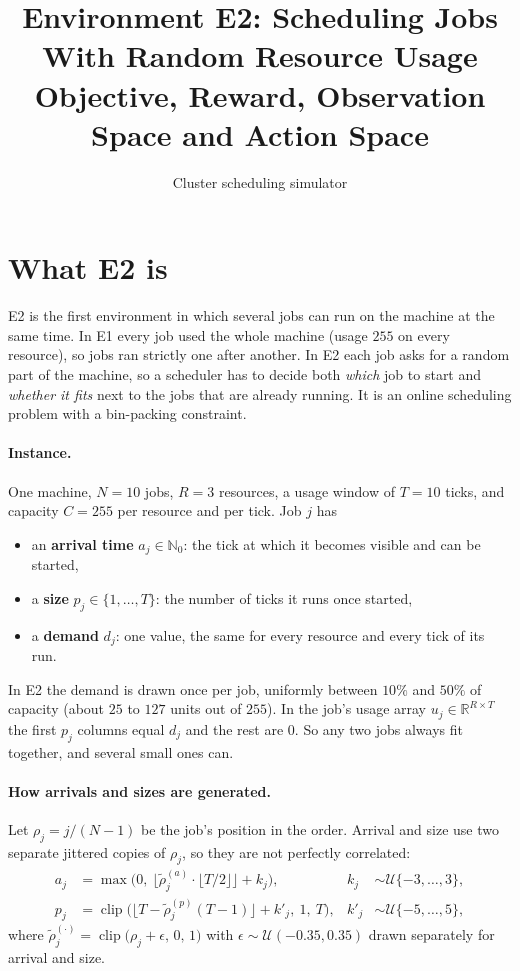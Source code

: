 \documentclass[11pt]{article}
\title{Environment E2: Scheduling Jobs With Random Resource Usage\\
\large Objective, Reward, Observation Space and Action Space}
\author{Cluster scheduling simulator}
\date{}
\newcommand{\N}{N}              %
\newcommand{\R}{R}              %
\newcommand{\Tw}{T}             %
\newcommand{\Cap}{C}            %
\begin{document}
\maketitle

\section{What E2 is}

E2 is the first environment in which several jobs can run on the machine at the same time. In E1 every job used the whole machine (usage $255$ on every resource), so jobs ran strictly one after another. In E2 each job asks for a random part of the machine, so a scheduler has to decide both \emph{which} job to start and \emph{whether it fits} next to the jobs that are already running. It is an online scheduling problem with a bin-packing constraint.

\paragraph{Instance.} One machine, $\N = 10$ jobs, $\R = 3$ resources, a usage window of $\Tw = 10$ ticks, and capacity $\Cap = 255$ per resource and per tick. Job $j$ has

\begin{itemize}[noitemsep]
  \item an \textbf{arrival time} $a_j \in \mathbb{N}_0$: the tick at which it becomes visible and can be started,
  \item a \textbf{size} $p_j \in \{1,\dots,\Tw\}$: the number of ticks it runs once started,
  \item a \textbf{demand} $d_j$: one value, the same for every resource and every tick of its run.
\end{itemize}

In E2 the demand is drawn once per job, uniformly between $10\%$ and $50\%$ of capacity (about $25$ to $127$ units out of $255$). In the job's usage array $u_j \in \mathbb{R}^{\R \times \Tw}$ the first $p_j$ columns equal $d_j$ and the rest are $0$. So any two jobs always fit together, and several small ones can.

\paragraph{How arrivals and sizes are generated.} Let $\rho_j = j/(\N-1)$ be the job's position in the order. Arrival and size use two separate jittered copies of $\rho_j$, so they are not perfectly correlated:
\begin{align*}
  a_j &= \max\!\Big(0,\ \big\lfloor \tilde\rho_j^{(a)} \cdot \lfloor \Tw/2 \rfloor \big\rfloor + k_j\Big), & k_j &\sim \mathcal{U}\{-3,\dots,3\},\\
  p_j &= \operatorname{clip}\!\Big(\big\lfloor \Tw - \tilde\rho_j^{(p)}(\Tw-1) \big\rfloor + k'_j,\ 1,\ \Tw\Big), & k'_j &\sim \mathcal{U}\{-5,\dots,5\},
\end{align*}
where $\tilde\rho^{(\cdot)}_j = \operatorname{clip}\big(\rho_j + \epsilon,\,0,\,1\big)$ with $\epsilon \sim \mathcal{U}(-0.35, 0.35)$ drawn separately for arrival and size.
\end{document}
